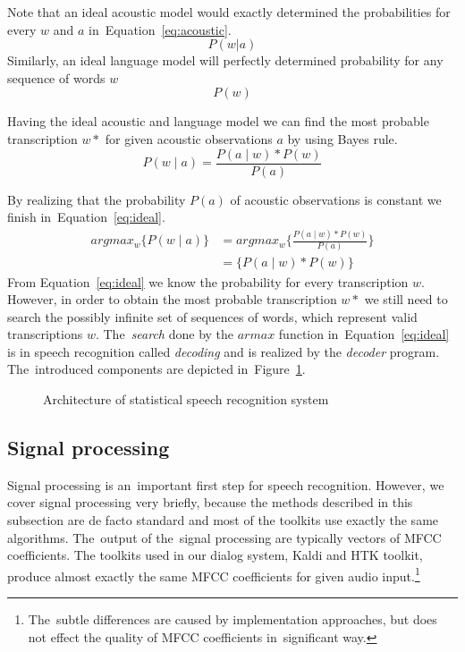 Note that an ideal acoustic model would exactly determined the probabilities for every $w$ and $a$ in~Equation~\ref{eq:acoustic}.
\begin{equation}\label{eq:acoustic}
    P(w|a)
\end{equation}
Similarly, an ideal language model will perfectly determined probability for any sequence of words $w$
\begin{equation}
    P(w)
\end{equation}

Having the ideal acoustic and language model we can find the most probable transcription $w*$ for given acoustic observations $a$ by using Bayes rule.
\begin{equation}
    P(w \mid a) = \frac{P(a \mid w) * P(w)}{P(a)}
\end{equation}

By realizing that the probability $P(a)$ of acoustic observations is constant we finish in~Equation~\ref{eq:ideal}.
\begin{align}\label{eq:ideal}
    argmax_w\{P(w \mid a)\} &= argmax_w \{\frac{P(a \mid w) * P(w)}{P(a)}\}\\
                            &= \{P(a \mid w) * P(w)\}
\end{align}
From Equation~\ref{eq:ideal} we know the probability for every transcription $w$. However, in order to obtain the most probable transcription $w*$ we still need to search the possibly infinite set of sequences of words, which represent valid transcriptions $w$. The~{\it search}\/ done by the $armax$ function in~Equation~\ref{eq:ideal} is in speech recognition called {\it decoding}\/ and is realized by the {\it decoder}\/ program. The~introduced components are depicted in~Figure~\ref{fig:components}.
\begin{figure}[!htp]
    \begin{center}
    
    \caption{Architecture of statistical speech recognition system\cite{ney1990acoustic} }
    \label{fig:components} 
    \end{center}
\end{figure}



\subsection{Signal processing}
\label{sub:signal}
Signal processing is an~important first step for speech recognition. However, we cover signal processing very briefly, because the methods described in this subsection are de facto standard and most of the toolkits use exactly the same algorithms. The~output of the~signal processing are typically vectors of \ac{MFCC} coefficients. The toolkits used in our dialog system, Kaldi and \ac{HTK} toolkit, produce almost exactly the same \ac{MFCC} coefficients for given audio input.\footnote{The~subtle differences are caused by implementation approaches, but does not effect the quality of \ac{MFCC} coefficients in~significant way.}

